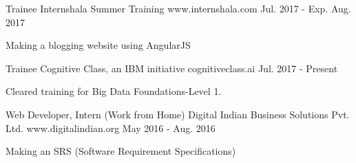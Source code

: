 


\begin{cventries}


\cventry
{Trainee} %
{Internshala Summer Training} %
{www.internshala.com} %
{Jul. 2017 - Exp. Aug. 2017} %
{ %
\begin{cvitems}
\item {Making a blogging website using AngularJS}
\end{cvitems}
}


\cventry
{Trainee} %
{Cognitive Class, an IBM initiative} %
{cognitiveclass.ai} %
{Jul. 2017 - Present} %
{ %
\begin{cvitems}
\item {Cleared training for Big Data Foundations-Level 1.}
\end{cvitems}
}


\cventry
{Web Developer, Intern (Work from Home)} %
{Digital Indian Business Solutions Pvt. Ltd.} %
{www.digitalindian.org} %
{May 2016 - Aug. 2016} %
{ %
\begin{cvitems}
\item {Making an SRS (Software Requirement Specifications)}
\end{cvitems}
}


\end{cventries}